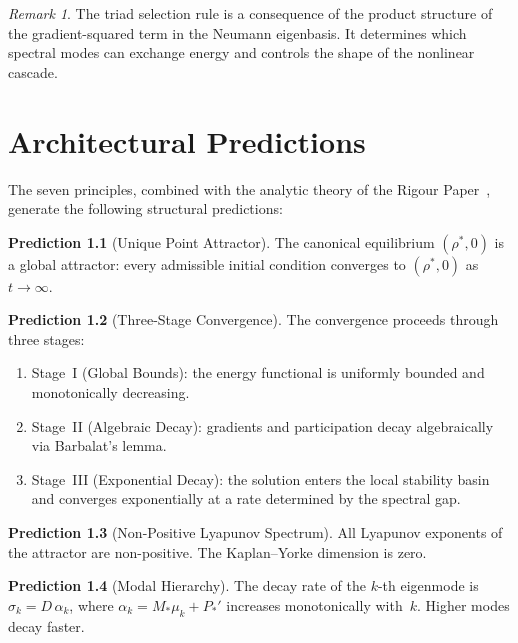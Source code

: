 \documentclass[11pt,twoside,openright]{book}
\theoremstyle{definition}
\theoremstyle{plain}
\theoremstyle{definition}
\newtheorem{prediction}{Prediction}[chapter]
\theoremstyle{remark}
\newtheorem{remark}{Remark}[chapter]
\newcommand{\rhostar}{\rho^{*}}
\begin{document}
\begin{remark}\label{rem:prin7}
The triad selection rule is a consequence of the product structure of the gradient-squared term in the Neumann eigenbasis. It determines which spectral modes can exchange energy and controls the shape of the nonlinear cascade.
\end{remark}


\chapter{Architectural Predictions}\label{ch:predictions}

The seven principles, combined with the analytic theory of the Rigour Paper~\cite{rigour}, generate the following structural predictions:

\begin{prediction}[Unique Point Attractor]\label{pred:attractor}
The canonical equilibrium \((\rhostar, 0)\) is a global attractor: every admissible initial condition converges to \((\rhostar, 0)\) as \(t \to \infty\).
\end{prediction}

\begin{prediction}[Three-Stage Convergence]\label{pred:three-stage}
The convergence proceeds through three stages:
\begin{enumerate}
\item Stage~I (Global Bounds): the energy functional is uniformly bounded and monotonically decreasing.
\item Stage~II (Algebraic Decay): gradients and participation decay algebraically via Barbalat's lemma.
\item Stage~III (Exponential Decay): the solution enters the local stability basin and converges exponentially at a rate determined by the spectral gap.
\end{enumerate}
\end{prediction}

\begin{prediction}[Non-Positive Lyapunov Spectrum]\label{pred:lyapunov}
All Lyapunov exponents of the attractor are non-positive. The Kaplan--Yorke dimension is zero.
\end{prediction}

\begin{prediction}[Modal Hierarchy]\label{pred:hierarchy}
The decay rate of the \(k\)-th eigenmode is \(\sigma_k = D\,\alpha_k\), where \(\alpha_k = M_*\mu_k + P_*'\) increases monotonically with~\(k\). Higher modes decay faster.
\end{prediction}
\end{document}
